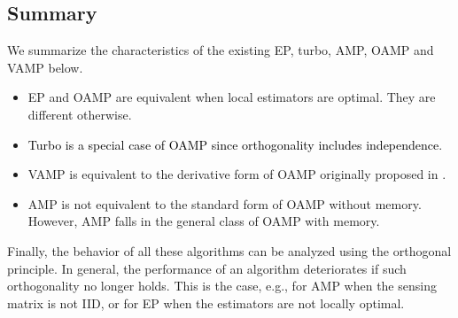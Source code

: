 \documentclass[journal]{IEEEtran}
\newcommand{\mr}{\mathrm}
\newcommand{\BS}{\begin{subequations}}
\newcommand{\ES}{\end{subequations}}
\renewcommand{\bf}{\bm}
\newcommand{\LL}[1]{\textcolor{black}{#1}}
\begin{document}
 
 \subsection{Summary}
 We summarize the characteristics of the existing EP, turbo, AMP, OAMP and VAMP below.  
\begin{itemize}
    \item EP and OAMP are equivalent when local estimators are optimal. They are different otherwise.
    \item  \LL{Turbo is a special case of OAMP since orthogonality includes independence}. 
    \item  VAMP is equivalent to the derivative form of OAMP originally proposed in \cite{Ma2016}.
    \item AMP is not equivalent to the standard form of OAMP without memory. However, AMP falls in the general class of OAMP with memory. 
\end{itemize}

Finally, the behavior of all these algorithms can be analyzed using the orthogonal principle. In general, the performance of an algorithm deteriorates if such orthogonality no longer holds. This is the case, e.g., for AMP when the sensing matrix is not IID, or for EP when the  estimators are not locally optimal.
 

\end{document}
